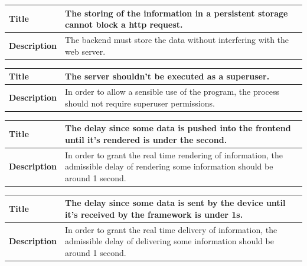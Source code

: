 \documentclass[12pt]{article}
\begin{document}
                \begin{tabularx}{\textwidth}{|l|X|}
                    \hline
                    \textbf{Title} & The storing of the information in a
                    persistent storage cannot block a http request. \\
                    \hline
                    \textbf{Description} & The backend must store the data
                    without interfering with the web server. \\
                    \hline
                \end{tabularx}

                \begin{tabularx}{\textwidth}{|l|X|}
                    \hline
                    \textbf{Title} & The server shouldn't be executed as a
                    superuser. \\
                    \hline
                    \textbf{Description} & In order to allow a sensible use of
                    the program, the process should not require superuser
                    permissions. \\
                    \hline
                \end{tabularx}

                \begin{tabularx}{\textwidth}{|l|X|}
                    \hline
                    \textbf{Title} & The delay since some data is pushed into
                    the frontend until it's rendered is under the second. \\
                    \hline
                    \textbf{Description} & In order to grant the real time
                    rendering of information, the admissible delay of rendering
                    some information should be around 1 second.\\
                    \hline
                \end{tabularx}

                \begin{tabularx}{\textwidth}{|l|X|}
                    \hline
                    \textbf{Title} & The delay since some data is sent by the
                    device until it's received by the framework is under 1s. \\
                    \hline
                    \textbf{Description} & In order to grant the real time
                    delivery of information, the admissible delay of delivering
                    some information should be around 1 second. \\
                    \hline
                \end{tabularx}
\end{document}
